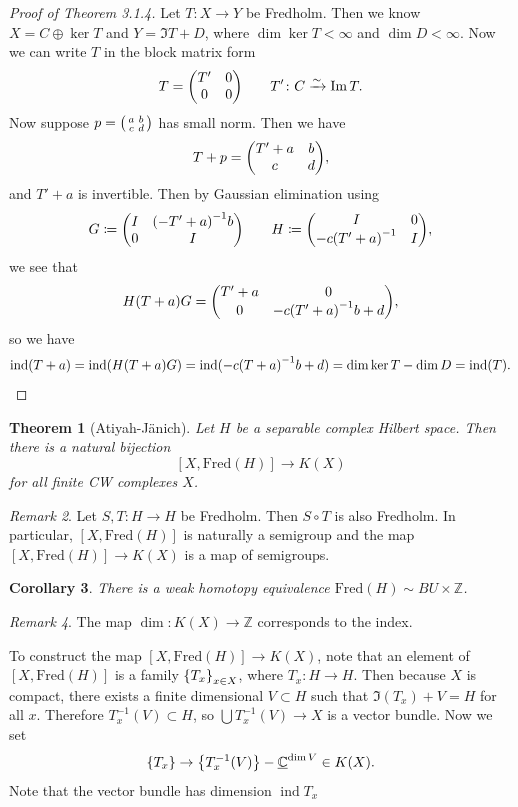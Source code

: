 \documentclass[leqno, openany]{memoir}
\newtheorem{thm}{Theorem}[section]
\newtheorem{cor}[thm]{Corollary}
\theoremstyle{definition}
\theoremstyle{remark}
\newtheorem{rmk}[thm]{Remark}
\theoremstyle{plain}
\theoremstyle{definition}
\theoremstyle{remark}
\newcommand{\C}{\mathbb{C}}
\newcommand{\Z}{\mathbb{Z}}
\newcommand{\mr}[1]{\mathrm{#1}}
\newcommand{\ul}[1]{\underline{#1}}
\DeclareMathOperator{\ind}{ind}
\begin{document}
\begin{proof}[Proof of Theorem 3.1.4]
    Let $T \colon X \to Y$ be Fredholm. Then we know $X = C \oplus \ker T$ and $Y = \Im T + D$, where $\dim \ker T < \infty$ and $\dim D < \infty$. Now we can write $T$ in the block matrix form
    \[ T = \mqty(T' & 0 \\ 0 & 0) \qquad T' \colon C \xrightarrow{\sim} \Im T. \] Now suppose $p = \begin{psmallmatrix}
    a & b \\ c & d
    \end{psmallmatrix}$ has small norm. Then we have 
    \[ T + p = \mqty(T' + a & b \\ c & d), \]
    and $T' + a$ is invertible. Then by Gaussian elimination using 
    \[ G \coloneqq \mqty(I & {(-T'+a)}^{-1} b \\ 0 & I) \qquad H \coloneqq \mqty(I & 0 \\ -c{(T'+a)}^{-1} & I), \]
    we see that
    \[ H(T+a)G = \mqty(T'+a & 0 \\ 0 & -c{(T'+a)}^{-1} b + d), \]
    so we have
    \[ \ind(T+a) = \ind(H (T+a)G) = \ind(-c{(T+a)}^{-1}b + d) = \dim \ker T - \dim D = \ind(T). \qedhere \]
\end{proof}

\begin{thm}[Atiyah-J\"anich]
    Let $H$ be a separable complex Hilbert space. Then there is a natural bijection
    \[ [X, \mr{Fred}(H)] \to K(X) \]
    for all finite CW complexes $X$.
\end{thm}

\begin{rmk}
    Let $S,T \colon H \to H$ be Fredholm. Then $S \circ T$ is also Fredholm. In particular, $[X, \mr{Fred}(H)]$ is naturally a semigroup and the map $[X, \mr{Fred}(H)] \to K(X)$ is a map of semigroups.
\end{rmk}

\begin{cor}
    There is a weak homotopy equivalence $\mr{Fred}(H) \sim BU \times \Z$.
\end{cor}

\begin{rmk}
    The map $\dim \colon K(X) \to \Z$ corresponds to the index.
\end{rmk}

To construct the map $[X, \mr{Fred}(H)] \to K(X)$, note that an element of $[X, \mr{Fred}(H)]$ is a family $\qty{T_x}_{x \in X}$, where $T_x \colon H \to H$. Then because $X$ is compact, there exists a finite dimensional $V \subset H$ such that $\Im(T_x) + V = H$ for all $x$. Therefore $T_x^{-1}(V) \subset H$, so $\bigcup T_x^{-1}(V) \to X$ is a vector bundle. Now we set 
\[ \qty{T_x} \to \qty{T_x^{-1}(V)} - \ul{\C}^{\dim V} \in K(X). \]
Note that the vector bundle has dimension $\ind T_x$
\end{document}
